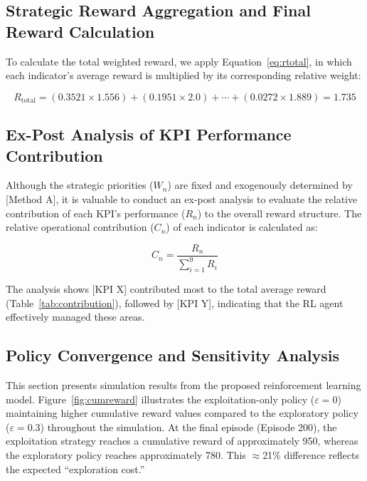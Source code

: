 \documentclass[10pt,twocolumn]{article}
\begin{document}
\subsection{Strategic Reward Aggregation and Final Reward
Calculation}

To calculate the total weighted reward, we apply
Equation~\eqref{eq:rtotal}, in which each indicator's average
reward is multiplied by its corresponding relative weight:

\begin{equation}
  R_{\mathrm{total}} = (0.3521 \times 1.556) + (0.1951 \times 2.0)
  + \cdots + (0.0272 \times 1.889) = 1.735
\end{equation}

\subsection{Ex-Post Analysis of KPI Performance Contribution}

Although the strategic priorities ($W_n$) are fixed and
exogenously determined by [Method A], it is valuable to conduct an
ex-post analysis to evaluate the relative contribution of each
KPI's performance ($R_n$) to the overall reward structure. The
relative operational contribution ($C_n$) of each indicator is
calculated as:

\begin{equation}
  C_n = \frac{R_n}{\sum_{i=1}^{9} R_i}
  \label{eq:contribution}
\end{equation}

The analysis shows [KPI X] contributed most to the total average
reward (Table~\ref{tab:contribution}), followed by [KPI Y],
indicating that the RL agent effectively managed these areas.

\subsection{Policy Convergence and Sensitivity Analysis}

This section presents simulation results from the proposed
reinforcement learning model. Figure~\ref{fig:cumreward} illustrates
the exploitation-only policy ($\varepsilon = 0$) maintaining higher
cumulative reward values compared to the exploratory policy
($\varepsilon = 0.3$) throughout the simulation. At the final
episode (Episode 200), the exploitation strategy reaches a
cumulative reward of approximately 950, whereas the exploratory
policy reaches approximately 780. This $\approx$21\% difference
reflects the expected ``exploration cost.''
\end{document}
